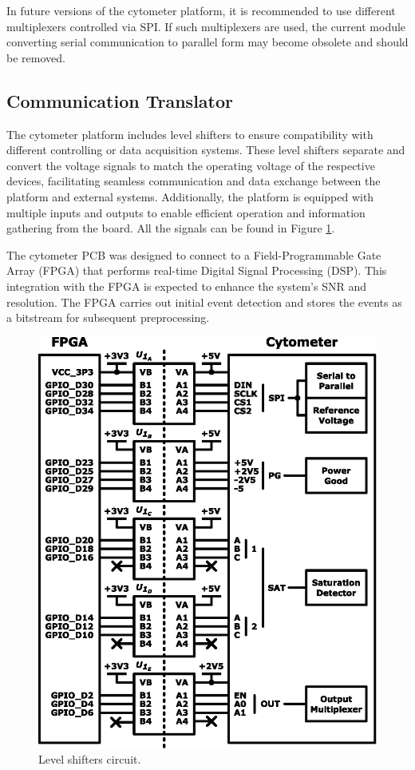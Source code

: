 In future versions of the cytometer platform, it is recommended to use different multiplexers controlled via SPI. If such multiplexers are used, the current module converting serial communication to parallel form may become obsolete and should be removed.

\subsection{Communication Translator}

The cytometer platform includes level shifters to ensure compatibility with different controlling or data acquisition systems. These level shifters separate and convert the voltage signals to match the operating voltage of the respective devices, facilitating seamless communication and data exchange between the platform and external systems. Additionally, the platform is equipped with multiple inputs and outputs to enable efficient operation and information gathering from the board. All the signals can be found in Figure \ref{fig:level-shifters}.

The cytometer PCB was designed to connect to a Field-Programmable Gate Array (FPGA) that performs real-time Digital Signal Processing (DSP). This integration with the FPGA is expected to enhance the system's SNR and resolution. The FPGA carries out initial event detection and stores the events as a bitstream for subsequent preprocessing.

\begin{figure}[!ht]
    \centering
    \includegraphics[width=.475\textwidth]{figs/comms.eps}
    \caption{Level shifters circuit.}
    \label{fig:level-shifters}
\end{figure}


